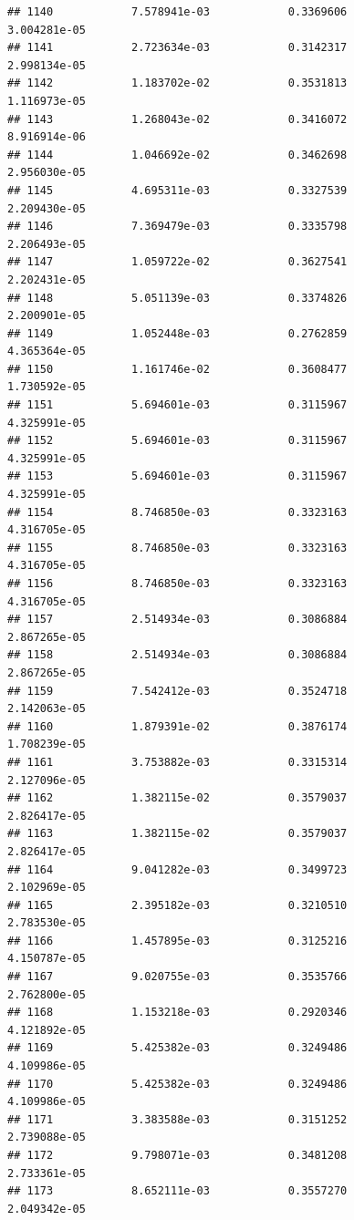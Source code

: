 \documentclass[
]{article}
\begin{document}
\begin{verbatim}
## 1140            7.578941e-03            0.3369606            3.004281e-05
## 1141            2.723634e-03            0.3142317            2.998134e-05
## 1142            1.183702e-02            0.3531813            1.116973e-05
## 1143            1.268043e-02            0.3416072            8.916914e-06
## 1144            1.046692e-02            0.3462698            2.956030e-05
## 1145            4.695311e-03            0.3327539            2.209430e-05
## 1146            7.369479e-03            0.3335798            2.206493e-05
## 1147            1.059722e-02            0.3627541            2.202431e-05
## 1148            5.051139e-03            0.3374826            2.200901e-05
## 1149            1.052448e-03            0.2762859            4.365364e-05
## 1150            1.161746e-02            0.3608477            1.730592e-05
## 1151            5.694601e-03            0.3115967            4.325991e-05
## 1152            5.694601e-03            0.3115967            4.325991e-05
## 1153            5.694601e-03            0.3115967            4.325991e-05
## 1154            8.746850e-03            0.3323163            4.316705e-05
## 1155            8.746850e-03            0.3323163            4.316705e-05
## 1156            8.746850e-03            0.3323163            4.316705e-05
## 1157            2.514934e-03            0.3086884            2.867265e-05
## 1158            2.514934e-03            0.3086884            2.867265e-05
## 1159            7.542412e-03            0.3524718            2.142063e-05
## 1160            1.879391e-02            0.3876174            1.708239e-05
## 1161            3.753882e-03            0.3315314            2.127096e-05
## 1162            1.382115e-02            0.3579037            2.826417e-05
## 1163            1.382115e-02            0.3579037            2.826417e-05
## 1164            9.041282e-03            0.3499723            2.102969e-05
## 1165            2.395182e-03            0.3210510            2.783530e-05
## 1166            1.457895e-03            0.3125216            4.150787e-05
## 1167            9.020755e-03            0.3535766            2.762800e-05
## 1168            1.153218e-03            0.2920346            4.121892e-05
## 1169            5.425382e-03            0.3249486            4.109986e-05
## 1170            5.425382e-03            0.3249486            4.109986e-05
## 1171            3.383588e-03            0.3151252            2.739088e-05
## 1172            9.798071e-03            0.3481208            2.733361e-05
## 1173            8.652111e-03            0.3557270            2.049342e-05

\end{verbatim}
\end{document}
